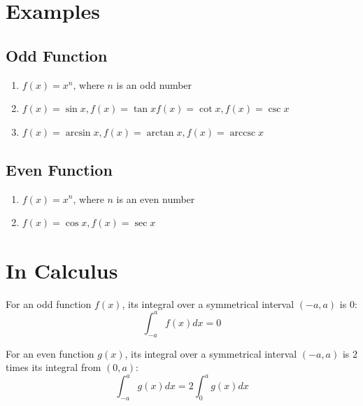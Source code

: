 \documentclass{article}
\DeclareMathOperator{\arccsc}{arccsc}
\numberwithin{equation}{section}
\begin{document}
\section{Examples}
\subsection{Odd Function}

\begin{enumerate}
    \item $f(x) = x^n$, where $n$ is an odd number
    \item $f(x) = \sin x, f(x) = \tan x f(x) = \cot x, f(x) = \csc x$
    \item $f(x) = \arcsin x, f(x) = \arctan x, f(x) = \arccsc x$
\end{enumerate}

\subsection{Even Function}
\begin{enumerate}
    \item $f(x) = x^n$, where $n$ is an even number
    \item $f(x) = \cos x, f(x) = \sec x$
\end{enumerate}

\section{In Calculus}
For an odd function $f(x)$, its integral over a symmetrical interval $(-a,a)$ is $0$:
\begin{equation}
    \int_{-a}^a f(x) dx = 0
\end{equation}

For an even function $g(x)$, its integral over a symmetrical interval $(-a,a)$ is $2$ times its integral from $(0,a)$:
\begin{equation}
    \int_{-a}^{a} g(x) dx = 2\int_0^a g(x)dx
\end{equation}
\end{document}
